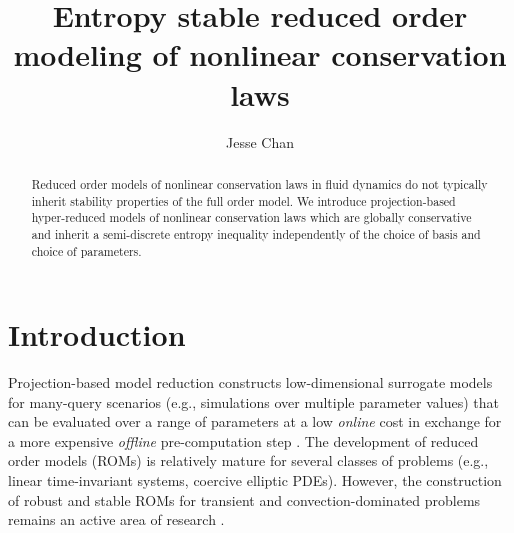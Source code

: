 \documentclass[preprint,10pt]{elsarticle}
\theoremstyle{definition}
\theoremstyle{lemma}
\theoremstyle{theorem}
\theoremstyle{assumption}
\begin{document}
\begin{frontmatter}
\title{Entropy stable reduced order modeling of nonlinear conservation laws}

\author[rice]{Jesse Chan}
\address[rice]{Department of Computational and Applied Mathematics, Rice University, 6100 Main St, Houston, TX, 77005}

\begin{abstract}
Reduced order models of nonlinear conservation laws in fluid dynamics do not typically inherit stability properties of the full order model. We introduce projection-based hyper-reduced models of nonlinear conservation laws which are globally conservative and inherit a semi-discrete entropy inequality independently of the choice of basis and choice of parameters.  
\end{abstract}
\end{frontmatter}



\section{Introduction}

Projection-based model reduction constructs low-dimensional surrogate models for many-query scenarios (e.g., simulations over multiple parameter values) that can be evaluated over a range of parameters at a low \textit{online} cost in exchange for a more expensive \textit{offline} pre-computation step \cite{benner2015survey}.  The development of reduced order models (ROMs) is relatively mature for several classes of problems (e.g., linear time-invariant systems, coercive elliptic PDEs).  However, the construction of robust and stable ROMs for transient and convection-dominated problems remains an active area of research \cite{cagniart2019model}.  
\end{document}
